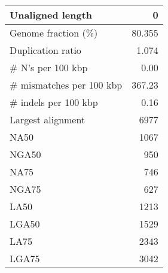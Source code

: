 \documentclass[12pt,a4paper]{article}
\begin{document}
\begin{table}[ht]
\begin{center}
\begin{tabular}{|l*{1}{|r}|}
Unaligned length & 0 \\ \hline
Genome fraction (\%) & 80.355 \\ \hline
Duplication ratio & 1.074 \\ \hline
\# N's per 100 kbp & 0.00 \\ \hline
\# mismatches per 100 kbp & 367.23 \\ \hline
\# indels per 100 kbp & 0.16 \\ \hline
Largest alignment & 6977 \\ \hline
NA50 & 1067 \\ \hline
NGA50 & 950 \\ \hline
NA75 & 746 \\ \hline
NGA75 & 627 \\ \hline
LA50 & 1213 \\ \hline
LGA50 & 1529 \\ \hline
LA75 & 2343 \\ \hline
LGA75 & 3042 \\ \hline
\end{tabular}
\end{center}
\end{table}
\end{document}
